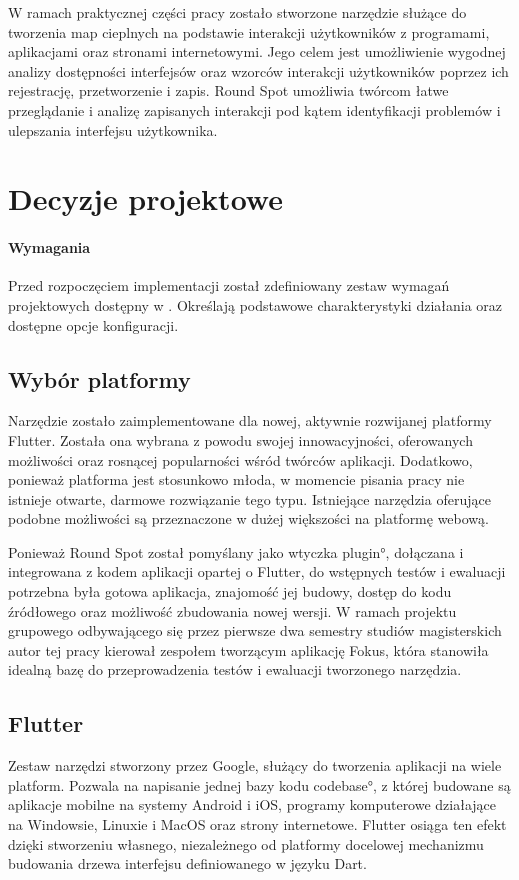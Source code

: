W ramach praktycznej części pracy zostało stworzone narzędzie służące do tworzenia map cieplnych na podstawie interakcji użytkowników z programami, aplikacjami oraz stronami internetowymi. Jego celem jest umożliwienie wygodnej analizy dostępności interfejsów oraz wzorców interakcji użytkowników poprzez ich rejestrację, przetworzenie i zapis. Round Spot umożliwia twórcom łatwe przeglądanie i analizę zapisanych interakcji pod kątem identyfikacji problemów i ulepszania interfejsu użytkownika.

\section{Decyzje projektowe}

\paragraph{Wymagania} Przed rozpoczęciem implementacji został zdefiniowany zestaw wymagań projektowych dostępny w . Określają podstawowe charakterystyki działania oraz dostępne opcje konfiguracji.

\subsection{Wybór platformy}
Narzędzie zostało zaimplementowane dla nowej, aktywnie rozwijanej platformy Flutter. Została ona wybrana z powodu swojej innowacyjności, oferowanych możliwości oraz rosnącej popularności wśród twórców aplikacji. Dodatkowo, ponieważ platforma jest stosunkowo młoda, w momencie pisania pracy nie istnieje otwarte, darmowe rozwiązanie tego typu. Istniejące narzędzia oferujące podobne możliwości są przeznaczone w dużej większości na platformę webową.

Ponieważ Round Spot został pomyślany jako wtyczka \ang{plugin}, dołączana i integrowana z kodem aplikacji opartej o Flutter, do wstępnych testów i ewaluacji potrzebna była gotowa aplikacja, znajomość jej budowy, dostęp do kodu źródłowego oraz możliwość zbudowania nowej wersji. W ramach projektu grupowego odbywającego się przez pierwsze dwa semestry studiów magisterskich autor tej pracy kierował zespołem tworzącym aplikację Fokus, która stanowiła idealną bazę do przeprowadzenia testów i ewaluacji tworzonego narzędzia.

\subsection{Flutter}
Zestaw narzędzi stworzony przez Google, służący do tworzenia aplikacji na wiele platform. Pozwala na napisanie jednej bazy kodu \ang{codebase}, z której budowane są aplikacje mobilne na systemy Android i iOS, programy komputerowe działające na Windowsie, Linuxie i MacOS oraz strony internetowe. Flutter osiąga ten efekt dzięki stworzeniu własnego, niezależnego od platformy docelowej mechanizmu budowania drzewa interfejsu definiowanego w języku Dart. 

